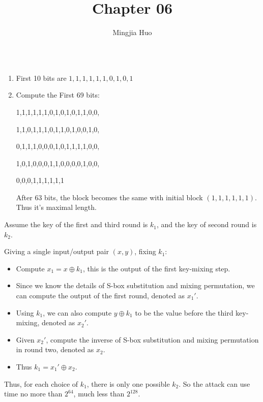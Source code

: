 \documentclass[a4paper]{article}
\newenvironment{problem}[2][Problem]{\begin{trivlist}
\item[\hskip \labelsep {\bfseries #1}\hskip \labelsep {\bfseries #2.}]}{\end{trivlist}}
\begin{document}
 
 
\title{Chapter 06}
\author{Mingjia Huo}
\date{}
\maketitle

\begin{problem}{6.1}
$ $\par
\begin{enumerate}
    \item First 10 bits are $1,1,1,1,1,1,0,1,0,1$
    \item Compute the First 69 bits:\par
    1,1,1,1,1,1,0,1,0,1,0,1,1,0,0,\par
    1,1,0,1,1,1,0,1,1,0,1,0,0,1,0,\par
    0,1,1,1,0,0,0,1,0,1,1,1,1,0,0,\par
    1,0,1,0,0,0,1,1,0,0,0,0,1,0,0,\par
    0,0,0,1,1,1,1,1,1\par
    After 63 bits, the block becomes the same with initial block $(1,1,1,1,1,1)$. Thus it's maximal length.\par
\end{enumerate}
\end{problem}
\begin{problem}{6.6(b)}
Assume the key of the first and third round is $k_1$, and the key of second round is $k_2$.\par
Giving a single input/output pair $(x,y)$, fixing $k_1$:
\begin{itemize}
    \item Compute $x_1=x\oplus k_1$, this is the output of the first key-mixing step.
    \item Since we know the details of S-box substitution and mixing permutation, we can compute the output of the first round, denoted as $x_1'$.
    \item Using $k_1$, we can also compute $y\oplus k_1$ to be the value before the third key-mixing, denoted as $x_2'$.
    \item Given $x_2'$, compute the inverse of S-box substitution and mixing permutation in round two, denoted as $x_2$. 
    \item Thus $k_1=x_1'\oplus x_2$.
\end{itemize}
Thus, for each choice of $k_1$, there is only one possible $k_2$. So the attack can use time no more than $2^{64}$, much less than $2^{128}$.
\end{problem}
\end{document}
